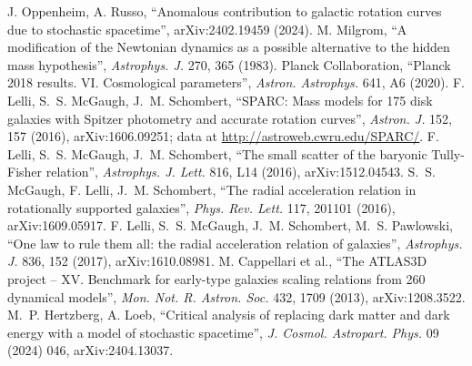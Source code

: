  J. Oppenheim, A. Russo, ``Anomalous contribution to galactic rotation curves due to stochastic spacetime'',
arXiv:2402.19459 (2024).
 M. Milgrom, ``A modification of the Newtonian dynamics as a possible alternative to the hidden mass hypothesis'',
\emph{Astrophys. J.} 270, 365 (1983).
 Planck Collaboration, ``Planck 2018 results. VI. Cosmological parameters'', \emph{Astron. Astrophys.} 641, A6 (2020).
 F. Lelli, S.~S. McGaugh, J.~M. Schombert, ``SPARC: Mass models for 175 disk galaxies with Spitzer photometry and
accurate rotation curves'', \emph{Astron. J.} 152, 157 (2016), arXiv:1606.09251; data at \url{http://astroweb.cwru.edu/SPARC/}.
 F. Lelli, S.~S. McGaugh, J.~M. Schombert, ``The small scatter of the baryonic Tully-Fisher relation'',
\emph{Astrophys. J. Lett.} 816, L14 (2016), arXiv:1512.04543.
 S.~S. McGaugh, F. Lelli, J.~M. Schombert, ``The radial acceleration relation in rotationally supported galaxies'',
\emph{Phys. Rev. Lett.} 117, 201101 (2016), arXiv:1609.05917.
 F. Lelli, S.~S. McGaugh, J.~M. Schombert, M.~S. Pawlowski, ``One law to rule them all: the radial acceleration
relation of galaxies'', \emph{Astrophys. J.} 836, 152 (2017), arXiv:1610.08981.
 M. Cappellari et al., ``The ATLAS3D project -- XV. Benchmark for early-type galaxies scaling relations from 260
dynamical models'', \emph{Mon. Not. R. Astron. Soc.} 432, 1709 (2013), arXiv:1208.3522.
 M.~P. Hertzberg, A. Loeb, ``Critical analysis of replacing dark matter and dark energy with a model of stochastic
spacetime'', \emph{J. Cosmol. Astropart. Phys.} 09 (2024) 046, arXiv:2404.13037.
